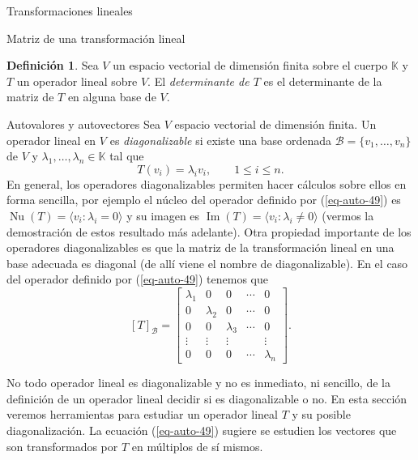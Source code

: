 \documentclass[a4paper,12pt,twoside,spanish,reqno]{amsbook}
\theoremstyle{definition}
\newtheorem{definicion}{Definici\'on}[section]
\theoremstyle{remark}
\newcommand{\img}{\operatorname{Im}}
\newcommand{\nuc}{\operatorname{Nu}}
\newcommand{\K}{\mathbb K}
\begin{document}
\begin{chapter}{Transformaciones lineales}
\begin{section}{Matriz de una transformación lineal}
		\begin{definicion} 
				Sea $V$ un espacio vectorial de dimensión finita sobre el cuerpo $\K$ y $T$ un operador lineal sobre $V$. El \textit{determinante de $T$} es el determinante de la matriz de $T$ en alguna base de $V$.  
		\end{definicion}
		\end{section}
	
	
	
	
	
	
	
		\begin{section}{Autovalores y autovectores}
		Sea $V$ espacio vectorial de dimensión finita. Un operador lineal en $V$ es \textit{diagonalizable}  si existe una base ordenada $\mathcal B= \{v_1,\ldots,v_n\}$ de $V$ y $\lambda_1,\ldots,\lambda_n \in \K$ tal que 
		\begin{equation}\label{eq-auto-49}
			T(v_i) = \lambda_i v_i,\qquad 1\le i \le n. 
		\end{equation}
		En  general, los operadores diagonalizables permiten hacer cálculos sobre ellos en forma sencilla, por ejemplo el núcleo del  operador definido por (\ref{eq-auto-49}) es $\nuc(T)=\langle v_i: \lambda_i =0 \rangle$ y  su imagen es $\img(T)=\langle v_i: \lambda_i \not=0 \rangle$ (vermos la demostración de estos resultado más adelante). 
		Otra propiedad importante de los operadores diagonalizables es que la matriz de la transformación lineal en una base adecuada es diagonal (de allí viene el nombre de diagonalizable). En  el caso del  operador definido por (\ref{eq-auto-49}) tenemos que
		$$
		[T]_{\mathcal B} = 
		\begin{bmatrix}
		\lambda_1&0&0&\cdots&0 \\
		0&\lambda_2&0&\cdots&0\\
		0&0&\lambda_3&\cdots&0\\
		\vdots&\vdots&\vdots&&\vdots\\
		0&0&0&\cdots&\lambda_n
		\end{bmatrix}.
		$$
		
		
		No todo operador lineal es diagonalizable y no es inmediato, ni sencillo, de la definición de un operador lineal decidir si es diagonalizable o no. En esta sección veremos herramientas para estudiar un operador lineal $T$ y su posible diagonalización. La ecuación (\ref{eq-auto-49}) sugiere se estudien los vectores que son transformados por $T$ en múltiplos de sí mismos.
		

\end{section}
\end{chapter}
\end{document}
